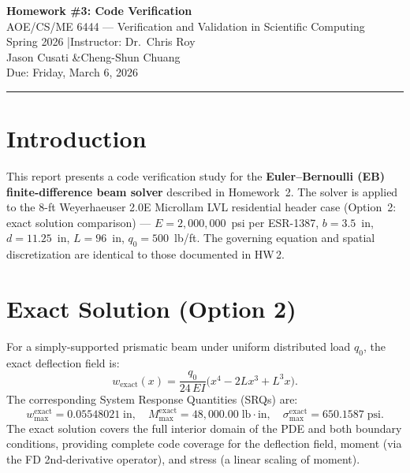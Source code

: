 \documentclass[11pt,letterpaper]{article}
\newcommand{\EI}{EI}
\begin{document}
\begin{center}
  {\LARGE\bfseries Homework \#3: Code Verification}\\[6pt]
  {\large AOE/CS/ME 6444 — Verification and Validation in Scientific Computing}\\
  {\large Spring 2026 \quad|\quad Instructor: Dr.\ Chris Roy}\\[4pt]
  {\large Jason Cusati \quad\&\quad Cheng-Shun Chuang}\\[2pt]
  {\normalsize Due: Friday, March 6, 2026}
\end{center}
\vspace{6pt}
\hrule
\vspace{10pt}

\section{Introduction}
\label{sec:intro}

This report presents a code verification study for the \textbf{Euler--Bernoulli (EB)
finite-difference beam solver} described in Homework~2.  The solver is applied to the
8-ft Weyerhaeuser 2.0E Microllam LVL residential header case (Option~2: exact
solution comparison) — $E=2{,}000{,}000$~psi per ESR-1387, $b=3.5$~in,
$d=11.25$~in, $L=96$~in, $q_0=500$~lb/ft.
The governing equation and spatial discretization are identical to those documented in HW\,2.

\section{Exact Solution (Option 2)}
\label{sec:exact}

For a simply-supported prismatic beam under uniform distributed load $q_0$,
the exact deflection field is:
\begin{equation}
  w_{\mathrm{exact}}(x) = \frac{q_0}{24\,\EI}
  \bigl(x^4 - 2L x^3 + L^3 x\bigr).
  \label{eq:exact}
\end{equation}
The corresponding System Response Quantities (SRQs) are:
\[
  w_{\max}^{\mathrm{exact}} = 0.05548021\;\text{in},\quad
  M_{\max}^{\mathrm{exact}} = 48{,}000.00\;\text{lb}\cdot\text{in},\quad
  \sigma_{\max}^{\mathrm{exact}} = 650.1587\;\text{psi}.
\]
The exact solution covers the full interior domain of the PDE and both boundary
conditions, providing complete code coverage for the deflection field, moment
(via the FD 2nd-derivative operator), and stress (a linear scaling of moment).
\end{document}
